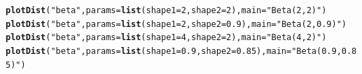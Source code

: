 \documentclass[twoside]{book}\usepackage[]{graphicx}\usepackage[]{xcolor}
\makeatletter
\newcommand{\hlnum}[1]{\textcolor[rgb]{0.686,0.059,0.569}{#1}}%
\newcommand{\hlstr}[1]{\textcolor[rgb]{0.192,0.494,0.8}{#1}}%
\newcommand{\hlstd}[1]{\textcolor[rgb]{0.345,0.345,0.345}{#1}}%
\newcommand{\hlkwc}[1]{\textcolor[rgb]{0.333,0.667,0.333}{#1}}%
\newcommand{\hlkwd}[1]{\textcolor[rgb]{0.737,0.353,0.396}{\textbf{#1}}}%
\newenvironment{kframe}{%
 \def\at@end@of@kframe{}%
 \ifinner\ifhmode%
  \def\at@end@of@kframe{\end{minipage}}%
  \begin{minipage}{\columnwidth}%
 \fi\fi%
 \def\FrameCommand##1{\hskip\@totalleftmargin \hskip-\fboxsep
 \colorbox{shadecolor}{##1}\hskip-\fboxsep
     \hskip-\linewidth \hskip-\@totalleftmargin \hskip\columnwidth}%
 \MakeFramed {\advance\hsize-\width
   \@totalleftmargin\z@ \linewidth\hsize
   \@setminipage}}%
 {\par\unskip\endMakeFramed%
 \at@end@of@kframe}
\newenvironment{knitrout}{}{} %
\makeatother
\begin{document}
\begin{knitrout}
\color{fgcolor}\begin{kframe}
\begin{alltt}
\hlkwd{plotDist}\hlstd{(}\hlstr{"beta"}\hlstd{,} \hlkwc{params}\hlstd{=}\hlkwd{list}\hlstd{(}\hlkwc{shape1}\hlstd{=}\hlnum{2}\hlstd{,} \hlkwc{shape2}\hlstd{=}\hlnum{2}\hlstd{),} \hlkwc{main}\hlstd{=}\hlstr{"Beta(2,2)"}\hlstd{)}
\hlkwd{plotDist}\hlstd{(}\hlstr{"beta"}\hlstd{,} \hlkwc{params}\hlstd{=}\hlkwd{list}\hlstd{(}\hlkwc{shape1}\hlstd{=}\hlnum{2}\hlstd{,} \hlkwc{shape2}\hlstd{=}\hlnum{0.9}\hlstd{),} \hlkwc{main}\hlstd{=}\hlstr{"Beta(2,0.9)"}\hlstd{)}
\hlkwd{plotDist}\hlstd{(}\hlstr{"beta"}\hlstd{,} \hlkwc{params}\hlstd{=}\hlkwd{list}\hlstd{(}\hlkwc{shape1}\hlstd{=}\hlnum{4}\hlstd{,} \hlkwc{shape2}\hlstd{=}\hlnum{2}\hlstd{),} \hlkwc{main}\hlstd{=}\hlstr{"Beta(4,2)"}\hlstd{)}
\hlkwd{plotDist}\hlstd{(}\hlstr{"beta"}\hlstd{,} \hlkwc{params}\hlstd{=}\hlkwd{list}\hlstd{(}\hlkwc{shape1}\hlstd{=}\hlnum{0.9}\hlstd{,} \hlkwc{shape2}\hlstd{=}\hlnum{0.85}\hlstd{),} \hlkwc{main}\hlstd{=}\hlstr{"Beta(0.9,0.85)"}\hlstd{)}
\end{alltt}
\end{kframe}


\end{knitrout}
\end{document}

